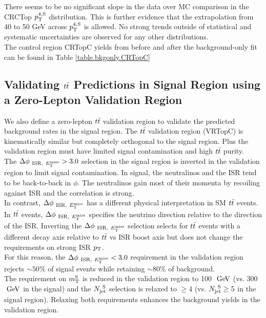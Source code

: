 \indent There seems to be no significant slope in the data over MC comparison in the CRCTop $p_{\mathrm{T}}^{4,\mathrm{S}}$ distribution.  This is further evidence that the extrapolation from 40 to 50 GeV across $p_{\mathrm{T}}^{4,\mathrm{S}}$ is allowed.  No strong trends outside of statistical and systematic uncertainties are observed for any other distributions. \\

\indent The control region CRTopC yields from before and after the background-only fit can be found in Table \ref{table.bkgonly.CRTopC}



\subsection{Validating $t\bar{t}$ Predictions in Signal Region using a Zero-Lepton Validation Region}
\label{sec:Bkg:ttbar:VR}

\indent We also define a zero-lepton $t\bar{t}$ validation region to validate the predicted background rates in the signal region.  The $t\bar{t}$ validation region (VRTopC) is kinematically similar but completely orthogonal to the signal region.  Plus the validation region must have limited signal contamination and high $t\bar{t}$ purity. \\

\indent The $\Delta\phi_{~\mathrm{ISR},~E_{\mathrm{T}}^{\mathrm{miss}}} > 3.0$ selection in the signal region is inverted in the validation region to limit signal contamination. In signal, the neutralinos and the ISR tend to be back-to-back in $\phi$.  The neutralinos gain most of their momenta by recoiling against ISR and the correlation is strong. \\

\indent In contrast, $\Delta\phi_{~\mathrm{ISR},~E_{\mathrm{T}}^{\mathrm{miss}}}$ has a different physical interpretation in SM $t\bar{t}$ events.   In $t\bar{t}$ events, $\Delta\phi_{~\mathrm{ISR},~E_{\mathrm{T}}^{\mathrm{miss}}}$ specifies the neutrino direction relative to the direction of the ISR.  Inverting the $\Delta\phi_{~\mathrm{ISR},~E_{\mathrm{T}}^{\mathrm{miss}}}$ selection selects for $t\bar{t}$ events with a different decay axis relative to $t\bar{t}$ vs ISR boost axis but does not change the requirements on strong ISR $p_{\mathrm{T}}$.  \\

\indent For this reason, the $\Delta\phi_{~\mathrm{ISR},~E_{\mathrm{T}}^{\mathrm{miss}}} < 3.0$ requirement in the validation region rejects $\sim50$\% of signal events while retaining $\sim80$\% of background. \\

\indent The requirement on $m_{\mathrm{T}}^{\mathrm{S}}$ is reduced in the validation region to 100 $\GeV$ (vs. 300 $\GeV$ in the signal) and the $N_{\mathrm{jet}}^{~\mathrm{S}}$ selection is relaxed to $\ge 4$ (vs. $N_{\mathrm{jet}}^{~\mathrm{S}} \ge 5$ in the signal region).  Relaxing both requirements enhances the background yields in the validation region. \\

